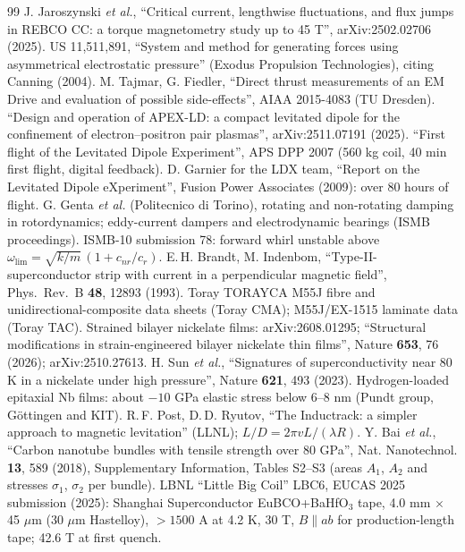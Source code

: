 \begin{thebibliography}{99}
 J. Jaroszynski \emph{et al.}, ``Critical current, lengthwise fluctuations, and flux jumps in REBCO CC: a torque magnetometry study up to 45 T'', arXiv:2502.02706 (2025).
 US 11,511,891, ``System and method for generating forces using asymmetrical electrostatic pressure'' (Exodus Propulsion Technologies), citing Canning (2004).
 M. Tajmar, G. Fiedler, ``Direct thrust measurements of an EM Drive and evaluation of possible side-effects'', AIAA 2015-4083 (TU Dresden).
 ``Design and operation of APEX-LD: a compact levitated dipole for the confinement of electron--positron pair plasmas'', arXiv:2511.07191 (2025).
 ``First flight of the Levitated Dipole Experiment'', APS DPP 2007 (560 kg coil, 40 min first flight, digital feedback).
 D. Garnier for the LDX team, ``Report on the Levitated Dipole eXperiment'', Fusion Power Associates (2009): over 80 hours of flight.
 G. Genta \emph{et al.} (Politecnico di Torino), rotating and non-rotating damping in rotordynamics; eddy-current dampers and electrodynamic bearings (ISMB proceedings).
 ISMB-10 submission 78: forward whirl unstable above $\omega_{\lim}=\sqrt{k/m}\,(1+c_{nr}/c_r)$.
 E.\,H. Brandt, M. Indenbom, ``Type-II-superconductor strip with current in a perpendicular magnetic field'', Phys.\ Rev.\ B \textbf{48}, 12893 (1993).
 Toray TORAYCA M55J fibre and unidirectional-composite data sheets (Toray CMA); M55J/EX-1515 laminate data (Toray TAC).
 Strained bilayer nickelate films: arXiv:2608.01295; ``Structural modifications in strain-engineered bilayer nickelate thin films'', Nature \textbf{653}, 76 (2026); arXiv:2510.27613.
 H. Sun \emph{et al.}, ``Signatures of superconductivity near 80 K in a nickelate under high pressure'', Nature \textbf{621}, 493 (2023).
 Hydrogen-loaded epitaxial Nb films: about $-10$ GPa elastic stress below 6--8 nm (Pundt group, Göttingen and KIT).
 R.\,F. Post, D.\,D. Ryutov, ``The Inductrack: a simpler approach to magnetic levitation'' (LLNL); $L/D=2\pi vL/(\lambda R)$.
 Y. Bai \emph{et al.}, ``Carbon nanotube bundles with tensile strength over 80 GPa'', Nat. Nanotechnol. \textbf{13}, 589 (2018), Supplementary Information, Tables S2--S3 (areas $A_1$, $A_2$ and stresses $\sigma_1$, $\sigma_2$ per bundle).
 LBNL ``Little Big Coil'' LBC6, EUCAS 2025 submission (2025): Shanghai Superconductor EuBCO+BaHfO$_3$ tape, 4.0 mm $\times$ 45 $\mu$m (30 $\mu$m Hastelloy), $>1500$ A at 4.2 K, 30 T, $B\parallel ab$ for production-length tape; 42.6 T at first quench.

\end{thebibliography}
